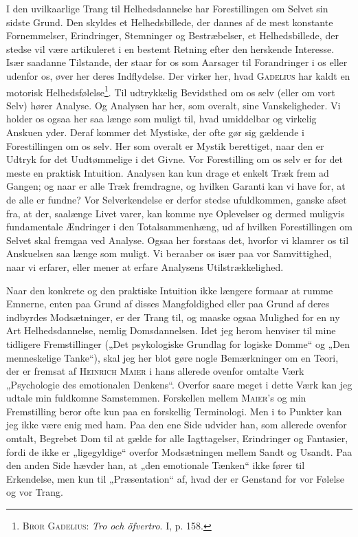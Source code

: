 \documentclass[12pt]{article}
\begin{document}
I den uvilkaarlige Trang til Helhedsdannelse har Forestillingen om Selvet
sin sidste Grund. Den skyldes et Helhedsbillede, der dannes af de mest konstante
Fornemmelser, Erindringer, Stemninger og Bestræbelser, et Helhedsbillede, der
stedse vil være artikuleret i en bestemt Retning efter den herskende Interesse. Især
saadanne Tilstande, der staar for os som Aarsager til Forandringer i os eller
udenfor os, øver her deres Indflydelse. Der virker her, hvad \textsc{Gadelius} har kaldt en
motorisk Helhedsfølelse\footnote{\textsc{Bror Gadelius}: \textit{Tro och öfvertro}.
I, p. 158.}. Til udtrykkelig Bevidsthed om os selv (eller om vort
Selv) hører Analyse. Og Analysen har her, som overalt, sine Vanskeligheder. Vi
holder os ogsaa her saa længe som muligt til, hvad umiddelbar og virkelig
Anskuen yder. Deraf kommer det Mystiske, der ofte gør sig gældende i Forestillingen
om os selv. Her som overalt er Mystik berettiget, naar den er Udtryk for det
Uudtømmelige i det Givne. Vor Forestilling om os selv er for det meste en
praktisk Intuition. Analysen kan kun drage et enkelt Træk frem ad Gangen; og naar
er alle Træk fremdragne, og hvilken Garanti kan vi have for, at de alle er fundne?
Vor Selverkendelse er derfor stedse ufuldkommen, ganske afset fra, at der,
saalænge Livet varer, kan komme nye Oplevelser og dermed muligvis fundamentale
Ændringer i den Totalsammenhæng, ud af hvilken Forestillingen om Selvet skal
fremgaa ved Analyse. Ogsaa her forstaas det, hvorfor vi klamrer os til Anskuelsen
saa længe som muligt. Vi beraaber os især paa vor Samvittighed, naar vi erfarer,
eller mener at erfare Analysens Utilstrækkelighed.

Naar den konkrete og den praktiske Intuition ikke længere formaar at rumme
Emnerne, enten paa Grund af disses Mangfoldighed eller paa Grund af deres
indbyrdes Modsætninger, er der Trang til, og maaske ogsaa Mulighed for en ny Art
Helhedsdannelse, nemlig Domsdannelsen. Idet jeg herom henviser til mine tidligere
Fremstillinger („Det psykologiske Grundlag for logiske Domme“ og „Den
menneskelige Tanke“), skal jeg her blot gøre nogle Bemærkninger om en Teori, der er
fremsat af \textsc{Heinrich Maier} i hans allerede ovenfor omtalte Værk „Psychologie des
emotionalen Denkens“. Overfor saare meget i dette Værk kan jeg udtale min
fuldkomne Samstemmen. Forskellen mellem \textsc{Maier}'s og min Fremstilling beror ofte
kun paa en forskellig Terminologi. Men i to Punkter kan jeg ikke være enig med
ham. Paa den ene Side udvider han, som allerede ovenfor omtalt, Begrebet Dom
til at gælde for alle Iagttagelser, Erindringer og Fantasier, fordi de ikke er
„ligegyldige“ overfor Modsætningen mellem Sandt og Usandt. Paa den anden Side
hævder han, at „den emotionale Tænken“ ikke fører til Erkendelse, men kun til
„Præsentation“ af, hvad der er Genstand for vor Følelse og vor Trang.
\end{document}
